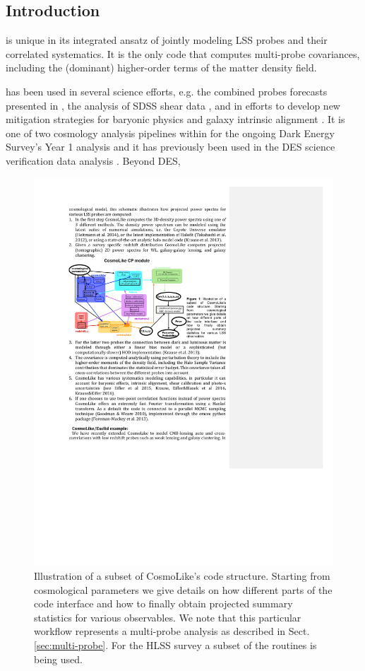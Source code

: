 \subsection{\CoLi Introduction}
\label{sec:cosmolike}

\begin{summaryii}
  \CoLi is unique in its integrated ansatz of jointly modeling LSS probes and their correlated systematics. It is the only code that computes multi-probe covariances, including the (dominant) higher-order terms of the matter density field.
\end{summaryii}

\CoLi has been used in several science efforts, e.g. the combined probes forecasts presented in \citep{eks14}, the analysis of SDSS shear data \citep{Huff2014}, and in efforts to develop new mitigation strategies for baryonic physics \citep{Eifler2015} and galaxy intrinsic alignment \citep{Krause2016}. It is one of two cosmology analysis pipelines within for the ongoing Dark Energy Survey's Year 1 analysis and it has previously been used in the DES science verification data analysis \citep{DES2015}. Beyond DES,
\begin{figure}
  \includegraphics[width=16.0cm]{Plots/forecasts/cosmolike_codestruct}
   \caption{Illustration of a subset of CosmoLike's code structure. Starting from cosmological parameters we give details on how different parts of the code interface and how to finally obtain projected summary statistics for various observables. We note that this particular workflow represents a multi-probe analysis as described in Sect. {\ref{sec:multi-probe}}. For the HLSS survey a subset of the routines is being used.
}
  \label{fi:fcosmolike}
\end{figure}
